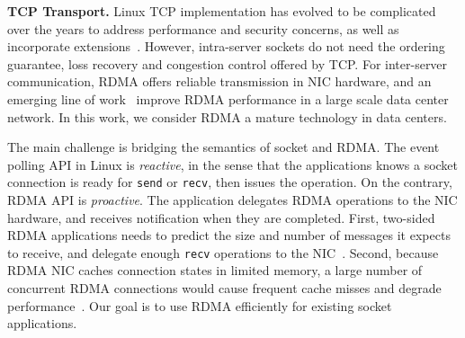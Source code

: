 
\textbf{TCP Transport.}
Linux TCP implementation has evolved to be complicated over the years to address performance and security concerns, as well as incorporate extensions~\cite{yasukata2016stackmap}. However, intra-server sockets do not need the ordering guarantee, loss recovery and congestion control offered by TCP. For inter-server communication, RDMA offers reliable transmission in NIC hardware, and an emerging line of work~\cite{zhu2015congestion,guo2016rdma,lu2017memory,mprdma} improve RDMA performance in a large scale data center network. In this work, we consider RDMA a mature technology in data centers.

The main challenge is bridging the semantics of socket and RDMA. The event polling API in Linux is \textit{reactive}, in the sense that the applications knows a socket connection is ready for \texttt{send} or \texttt{recv}, then issues the operation.
On the contrary, RDMA API is \textit{proactive}. The application delegates RDMA operations to the NIC hardware, and receives notification when they are completed.
First, two-sided RDMA applications needs to predict the size and number of messages it expects to receive, and delegate enough \texttt{recv} operations to the NIC~\cite{huang2017high}.
Second, because RDMA NIC caches connection states in limited memory, a large number of concurrent RDMA connections would cause frequent cache misses and degrade performance~\cite{mprdma,kaminsky2016design}.
Our goal is to use RDMA efficiently for existing socket applications.

